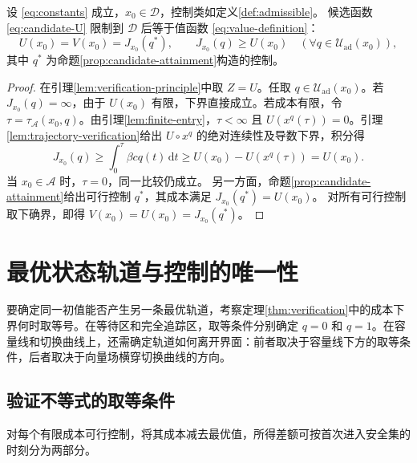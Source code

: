 \documentclass[lang=cn,a4paper,newtx]{elegantpaper}
\theoremstyle{plain}
\theoremstyle{definition}
\newcommand{\Acal}{\mathcal A}
\newcommand{\Dcal}{\mathcal D}
\newcommand{\Uad}{\mathcal U_{\mathrm{ad}}}
\newcommand{\dd}{\,\mathrm d}
\begin{document}
\begin{theorem}[常接触率下的全局最优性及最优值的实现]
\label{thm:verification}
设 \eqref{eq:constants} 成立，$x_0\in\Dcal$，控制类如定义\ref{def:admissible}。
候选函数 \eqref{eq:candidate-U} 限制到 $\Dcal$ 后等于值函数 \eqref{eq:value-definition}：
\begin{equation}
U(x_0)=V(x_0)=J_{x_0}(q^*),\qquad
J_{x_0}(q)\ge U(x_0)\quad(\forall q\in\Uad(x_0)),
\label{eq:global-optimality}
\end{equation}
其中 $q^*$ 为命题\ref{prop:candidate-attainment}构造的控制。
\end{theorem}
\begin{proof}
在引理\ref{lem:verification-principle}中取 $Z=U$。任取 $q\in\Uad(x_0)$。若 $J_{x_0}(q)=\infty$，由于 $U(x_0)$ 有限，下界直接成立。若成本有限，令 $\tau=\tau_{\Acal}(x_0,q)$。由引理\ref{lem:finite-entry}，$\tau<\infty$ 且 $U(x^q(\tau))=0$。引理\ref{lem:trajectory-verification}给出 $U\circ x^q$ 的绝对连续性及导数下界，积分得
\[
J_{x_0}(q)\ge\int_0^\tau\beta cq(t)\dd t
\ge U(x_0)-U(x^q(\tau))=U(x_0).
\]
当 $x_0\in\Acal$ 时，$\tau=0$，同一比较仍成立。
另一方面，命题\ref{prop:candidate-attainment}给出可行控制 $q^*$，其成本满足 $J_{x_0}(q^*)=U(x_0)$。
对所有可行控制取下确界，即得 $V(x_0)=U(x_0)=J_{x_0}(q^*)$。
\end{proof}

\section{最优状态轨道与控制的唯一性}
\label{sec:uniqueness}

要确定同一初值能否产生另一条最优轨道，考察定理\ref{thm:verification}中的成本下界何时取等号。在等待区和完全追踪区，取等条件分别确定 $q=0$ 和 $q=1$。在容量线和切换曲线上，还需确定轨道如何离开界面：前者取决于容量线下方的取等条件，后者取决于向量场横穿切换曲线的方向。

\subsection{验证不等式的取等条件}
对每个有限成本可行控制，将其成本减去最优值，所得差额可按首次进入安全集的时刻分为两部分。
\end{document}
